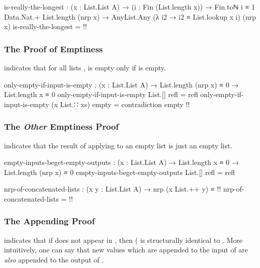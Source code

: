 \documentclass{report}
\begin{document}
\begin{code}
  is-really-the-longest :
    (x : List.List A) →
    (i : Fin (List.length x)) →
    Fin.toℕ i ≡ 1 Data.Nat.+ List.length (nrp x) →
    AnyList.Any (λ i2 → i2 ≡ List.lookup x i) (nrp x)
  is-really-the-longest = {!!}
\end{code}

\subsubsection{The Proof of Emptiness}
 indicates that for all lists ,   is empty only if  is empty.

\begin{code}
  only-empty-if-input-is-empty :
    (x : List.List A) →
    List.length (nrp x) ≡ 0 →
    List.length x ≡ 0
  only-empty-if-input-is-empty List.[] refl = refl
  only-empty-if-input-is-empty (x List.∷ xs) empty = contradiction empty {!!}
\end{code}

\subsubsection{The \emph{Other} Emptiness Proof}
 indicates that the result of applying  to an empty list is just an empty list.

\begin{code}
  empty-inputs-beget-empty-outputs :
    (x : List.List A) →
    List.length x ≡ 0 →
    List.length (nrp x) ≡ 0
  empty-inputs-beget-empty-outputs List.[] refl = refl
\end{code}

\begin{code}
  nrp-of-concatenated-lists :
    (x y : List.List A) →
    nrp (x List.++ y) ≡ {!!}
  nrp-of-concatenated-lists = {!!}
\end{code}

\subsubsection{The Appending Proof}
 indicates that if  does not appear in , then  \AgdaSymbol(  \AgdaOperator{\AgdaFunction{List.[}}  \AgdaOperator{\AgdaFunction{]}} is structurally identical to    \AgdaOperator{\AgdaFunction{List.[}}  \AgdaOperator{\AgdaFunction{]}}.  More intuitively, one can say that new values which are appended to the input of  are \emph{also} appended to the output of .
\end{document}
